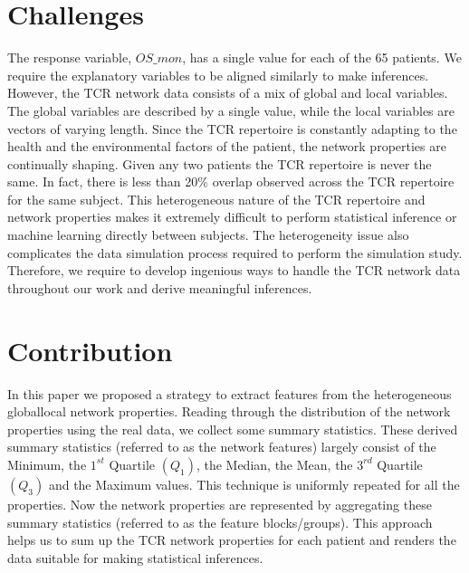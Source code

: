 \section{Challenges}\label{sec:challenges}
The response variable, $OS\_mon$, has a single value for each of the 65 patients. We require the explanatory variables to be aligned similarly to make inferences. However, the TCR network data consists of a mix of global and local variables. The global variables are described by a single value, while the local variables are vectors of varying length. Since the TCR repertoire is constantly adapting to the health and the environmental factors of the patient, the network properties are continually shaping. Given any two patients the TCR repertoire is never the same. In fact, there is less than 20$\%$ overlap observed across the TCR repertoire for the same subject. This heterogeneous nature of the TCR repertoire and network properties makes it extremely difficult to perform statistical inference or machine learning directly between subjects. The heterogeneity issue also complicates the data simulation process required to perform the simulation study. Therefore, we require to develop ingenious ways to handle the TCR network data throughout our work and derive meaningful inferences.\par

\section{Contribution}\label{sec:contribution}
In this paper we proposed a strategy to extract features from the heterogeneous global\/local network properties. Reading through the distribution of the network properties using the real data, we collect some summary statistics. These derived summary statistics (referred to as the network features) largely consist of the Minimum, the $1^{st}$ Quartile $(Q_1)$, the Median, the Mean, the $3^{rd}$ Quartile $(Q_3)$ and the Maximum values. This technique is uniformly repeated for all the properties. Now the network properties are represented by aggregating these summary statistics (referred to as the feature blocks/groups). This approach helps us to sum up the TCR network properties for each patient and renders the data suitable for making statistical inferences.\par


